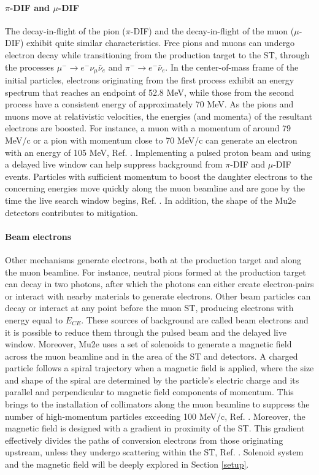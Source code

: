\paragraph{$\pi$-DIF and $\mu$-DIF}
The decay-in-flight of the pion ($\pi$-DIF) and the decay-in-flight of the muon ($\mu$-DIF) exhibit quite similar characteristics. Free pions and muons can 
undergo electron decay while transitioning from the production target to the ST, through the processes $\mu^- \rightarrow e^- \nu_\mu \bar{\nu}_e$ and $\pi^- \rightarrow e^- \bar{\nu}_e$. In the center-of-mass frame of the initial particles, electrons originating from the first process exhibit an energy spectrum that reaches an endpoint of 52.8 MeV, while those from the second process have a consistent energy of approximately 70 MeV. As the pions and muons move at relativistic velocities, the energies (and momenta) of the resultant electrons are boosted. For instance, a muon with a momentum of around 79 MeV/c or a pion with momentum close to 70 MeV/c can generate an electron with an energy of 105 MeV, Ref. \cite{bartoszek2015mu2e}. Implementing a pulsed proton beam and using a delayed live window can help suppress background from $\pi$-DIF and $\mu$-DIF events. Particles with sufficient momentum to boost the daughter electrons to the concerning energies move quickly along the muon beamline and are gone by the time the live search window begins, Ref. \cite{bobbb}. In addition, the shape of the Mu2e detectors contributes to mitigation.
\paragraph{Beam electrons}\label{beamelectrons}
Other mechanisms generate electrons, both at the production target and along the muon beamline. For instance, neutral pions formed at the production target can decay in two photons, after which the photons can either create electron-pairs or interact with nearby materials to generate electrons. Other beam particles can decay or interact at any point before the muon ST, producing electrons with energy equal to $E_{CE}$. These sources of background are called beam electrons and it is possible to reduce them through the pulsed beam and the delayed live window. Moreover, Mu2e uses a set of solenoids to generate a magnetic field across the muon beamline and in the area of the ST and detectors. A charged particle follows a spiral trajectory when a magnetic field is applied, where the size and shape of the spiral are determined by the particle's electric charge and its parallel and perpendicular to magnetic field components of momentum. This brings to the installation of collimators along the muon beamline to suppress the number of high-momentum particles exceeding 100 MeV/c, Ref. \cite{bartoszek2015mu2e}. Moreover, the magnetic field is 
designed with a gradient in proximity of the ST. This gradient effectively divides the paths of conversion electrons from those originating upstream, unless they undergo scattering within the ST, Ref. \cite{bobbb}. Solenoid system and the magnetic field will be deeply explored in Section \ref{setup}.
